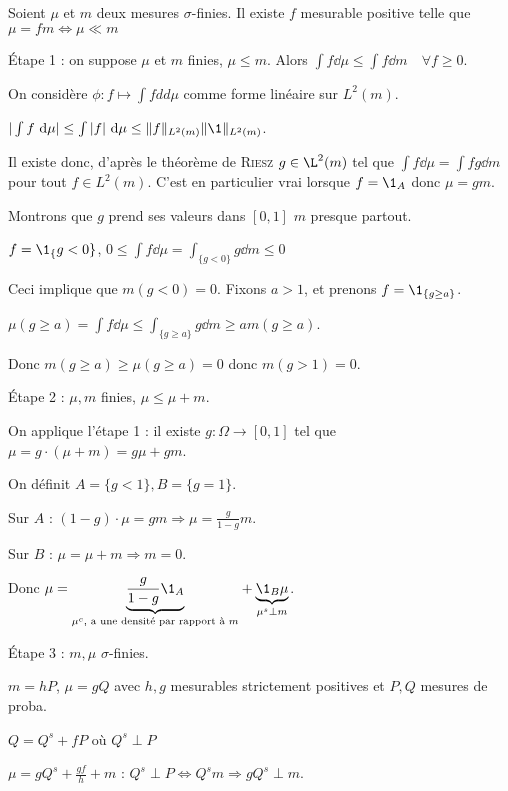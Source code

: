 \documentclass[10pt,a4paper,notitlepage ]{report}
\begin{document}
\begin{theorem}
	Soient $\mu$ et $m$ deux mesures $\sigma$-finies. Il existe $f$ mesurable positive telle que $\mu=fm \Leftrightarrow \mu \ll m$
\end{theorem}

\begin{demo}
	Étape 1 : on suppose $\mu$ et $m$ finies, $\mu \le m$. Alors $\int f \dd\mu \le \int f\dd m \quad \forall f \ge 0$.
	
	On considère $\phi : f \mapsto \int f dd\mu$ comme forme linéaire sur $L^2(m)$.
	
	$|\int f\dd\mu| \le \int |f|\dd\mu \le \|f\|_{L^2(m)} \|\1\|_{L^2(m)}$.
	
	Il existe donc, d'après le théorème de \textsc{Riesz} $g\in\L^2(m)$ tel que $\int f \dd\mu = \int fg\dd m$ pour tout $f\in L^2(m)$. C'est en particulier vrai lorsque $f=\1_A$ donc $\mu=gm$.
	
	Montrons que $g$ prend ses valeurs dans $[0,1]$ $m$ presque partout.
	
	$f=\1_\{g<0\}$, $0 \le \int f\dd\mu = \int_{\{g<0\}} g\dd m \le 0$
	
	Ceci implique que $m(g<0)=0$. Fixons $a>1$, et prenons $f=\1_{\{g\ge a\}}$.
	
	$\mu(g\ge a) = \int f\dd\mu \le \int_{\{g \ge a\}} g \dd m \ge am(g\ge a)$.
	
	Donc $m(g\ge a) \ge \mu(g\ge a) = 0$ donc $m(g > 1) = 0$.
	
	Étape 2 : $\mu, m$ finies, $\mu \le \mu + m$.
	
	On applique l'étape 1 : il existe $g:\Omega \rightarrow [0,1]$ tel que $\mu=g\cdot (\mu+m) = g\mu + gm$.
	
	On définit $A=\{g < 1\}, B=\{g=1\}$.
	
	Sur $A$ : $(1-g)\cdot \mu = gm \Rightarrow \mu = \frac g {1-g} m$.
	
	Sur $B$ : $\mu = \mu+m \Rightarrow m=0$.
	
	Donc $\mu = \underset{\mu^c, \text{ a une densité par rapport à }m}{\underbrace{\frac g {1-g} \1_A}} + \underset{\mu^s \perp m}{\underbrace{\1_B \mu}}$.
	
	Étape 3 : $m, \mu$ $\sigma$-finies. 
	
	$m=hP$, $\mu=gQ$ avec $h,g$ mesurables strictement positives et $P,Q$ mesures de proba.
	
	$Q=Q^s + fP$ où $Q^s \perp P$
	
	$\mu=gQ^s + \frac{gf}h+m$ : $Q^s \perp P \Leftrightarrow Q^s m \Rightarrow gQ^s \perp m$.
\end{demo}
\end{document}
